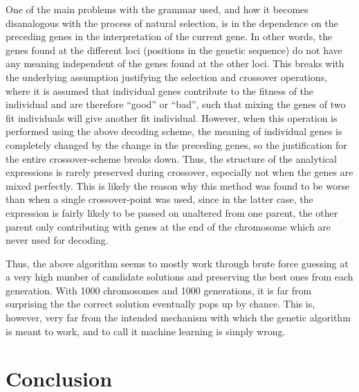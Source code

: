 \documentclass[multicolumn, 12pt]{extarticle}
\begin{document}
One of the main problems with the grammar used, and how it becomes disanalogous with the process of natural selection, is in the dependence on the preceding genes in the interpretation of the current gene. In other words, the genes found at the different loci (positions in the genetic sequence) do not have any meaning independent of the genes found at the other loci. This breaks with the underlying assumption justifying the selection and crossover operations, where it is assumed that individual genes contribute to the fitness of the individual and are therefore ``good'' or ``bad'', such that mixing the genes of two fit individuals will give another fit individual. However, when this operation is performed using the above decoding scheme, the meaning of individual genes is completely changed by the change in the preceding genes, so the justification for the entire crossover-scheme breaks down. Thus, the structure of the analytical expressions is rarely preserved during crossover, especially not when the genes are mixed perfectly. This is likely the reason why this method was found to be worse than when a single crossover-point was used, since in the latter case, the expression is fairly likely to be passed on unaltered from one parent, the other parent only contributing with genes at the end of the chromosome which are never used for decoding. 

Thus, the above algorithm seems to mostly work through brute force guessing at a very high number of candidate solutions and preserving the best ones from each generation. With 1000 chromosomes and 1000 generations, it is far from surprising the the correct solution eventually pops up by chance. This is, however, very far from the intended mechanism with which the genetic algorithm is meant to work, and to call it machine learning is simply wrong. 



\section{Conclusion}



\end{document}
